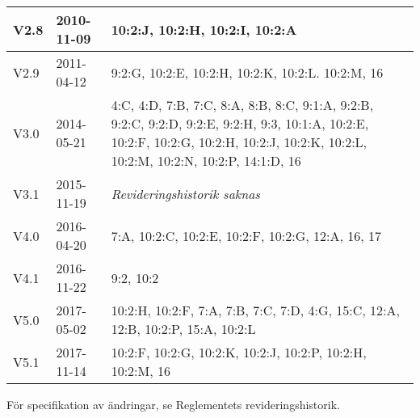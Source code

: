 \documentclass[10pt]{article}
\begin{document}
\begin{center}
\begin{tabular}{| l | l | p{10cm} |}
    \hline
    V2.8 & 2010-11-09 & 10:2:J, 10:2:H, 10:2:I, 10:2:A\\
    \hline
    V2.9 & 2011-04-12 & 9:2:G, 10:2:E, 10:2:H, 10:2:K, 10:2:L. 10:2:M, 16 \\
    \hline
    V3.0 & 2014-05-21 &  4:C, 4:D, 7:B, 7:C, 8:A, 8:B, 8:C, 9:1:A, 9:2:B, 9:2:C, 9:2:D, 9:2:E, 9:2:H, 9:3, 10:1:A, 10:2:E, 10:2:F, 10:2:G, 10:2:H, 10:2:J, 10:2:K, 10:2:L, 10:2:M, 10:2:N, 10:2:P, 14:1:D, 16\\
    \hline
    V3.1 & 2015-11-19 & \emph{Revideringshistorik saknas} \\
    \hline
    V4.0 & 2016-04-20 & 7:A, 10:2:C, 10:2:E, 10:2:F, 10:2:G, 12:A, 16, 17 \\
    \hline
    V4.1 & 2016-11-22 & 9:2, 10:2 \\
    \hline
    V5.0 & 2017-05-02 & 10:2:H, 10:2:F, 7:A, 7:B, 7:C, 7:D, 4:G, 15:C, 12:A, 12:B, 10:2:P, 15:A, 10:2:L \\
    \hline
    V5.1 & 2017-11-14 & 10:2:F, 10:2:G, 10:2:K, 10:2:J, 10:2:P, 10:2:H, 10:2:M, 16 \\
    \hline
\end{tabular}
\end{center}
För specifikation av ändringar, se Reglementets revideringshistorik.
\end{document}
